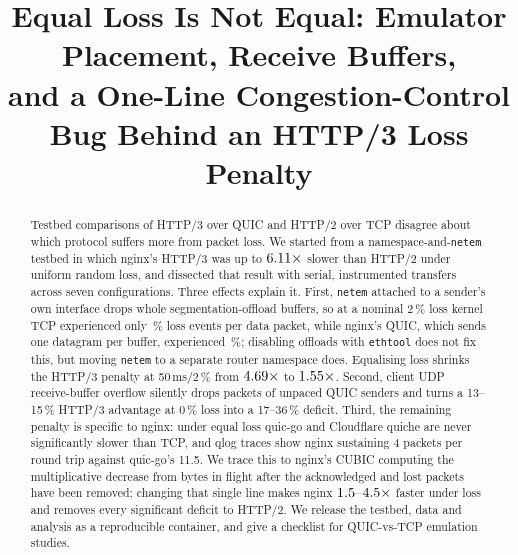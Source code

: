\documentclass[conference]{IEEEtran}
\newcommand{\hthree}{HTTP/3}
\newcommand{\htwo}{HTTP/2}
\begin{document}
\title{Equal Loss Is Not Equal: Emulator Placement, Receive Buffers,\\ and a One-Line Congestion-Control Bug Behind an
\hthree{} Loss Penalty}

\author{
\and
{}
}

\maketitle

\begin{abstract}
Testbed comparisons of \hthree{} over QUIC and \htwo{} over TCP disagree about which protocol suffers more from packet
loss. We started from a namespace-and-\texttt{netem} testbed in which nginx's \hthree{} was up to $6.11\times$
slower than \htwo{} under uniform random loss, and dissected that result with \TotalTransfers{} serial, instrumented
transfers across seven configurations. Three effects explain it. First, \texttt{netem} attached to a sender's own interface
drops whole segmentation-offload buffers, so at a nominal 2\,\% loss kernel TCP experienced only \LossATcpTwo\,\% loss
events per data packet, while nginx's QUIC, which sends one datagram per buffer, experienced \LossANgxTwo\,\%; disabling
offloads with \texttt{ethtool} does not fix this, but moving \texttt{netem} to a separate router namespace does. Equalising
loss shrinks the \hthree{} penalty at 50\,ms/2\,\% from $4.69\times$ to $1.55\times$. Second,
client UDP receive-buffer overflow silently drops packets of unpaced QUIC senders and turns a 13--15\,\% \hthree{} advantage
at 0\,\% loss into a 17--36\,\% deficit. Third, the remaining penalty is specific to nginx: under equal loss quic-go and
Cloudflare quiche are never significantly slower than TCP, and qlog traces show nginx sustaining 4 packets per round
trip against quic-go's 11.5. We trace this to nginx's CUBIC computing the multiplicative decrease from bytes in flight
after the acknowledged and lost packets have been removed; changing that single line makes nginx
$1.5$--$4.5\times$ faster under loss and removes every significant deficit to \htwo. We release the
testbed, data and analysis as a reproducible container, and give a checklist for QUIC-vs-TCP emulation studies.
\end{abstract}
\end{document}
